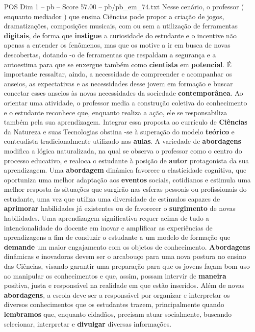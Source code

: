 \begin{textsample}{POS Dim 1 – pb – Score 57.00 – pb/pb\_em\_74.txt}
Nesse cenário, o professor ( enquanto mediador ) que ensina Ciências pode propor a criação de jogos, dramatizações, composições musicais, com ou sem a utilização de ferramentas \textbf{digitais}, de forma que \textbf{instigue} a curiosidade do estudante e o incentive não apenas a entender os fenômenos, mas que os motive a ir em busca de novas descobertas, dotando -o de ferramentas que respaldam a segurança e a autoestima para que se enxergue também como \textbf{cientista} em \textbf{potencial}.
É importante ressaltar, ainda, a necessidade de compreender e acompanhar os anseios, as expectativas e as necessidades desse jovem em formação e buscar conectar esses anseios às novas necessidades da sociedade \textbf{contemporânea}.
Ao orientar uma atividade, o professor media a construção coletiva do conhecimento e o estudante reconhece que, enquanto realiza a ação, ele se responsabiliza também pela sua aprendizagem.
Integrar essa proposta ao currículo de \textbf{Ciências} da Natureza e suas Tecnologias obstina -se à superação do modelo \textbf{teórico} e conteudista tradicionalmente utilizado nas \textbf{aulas}.
A variedade de \textbf{abordagens} modifica a lógica naturalizada, na qual se observa o professor como o centro do processo educativo, e realoca o estudante à posição de \textbf{autor} protagonista da sua aprendizagem.
Uma \textbf{abordagem} dinâmica favorece a elasticidade cognitiva, que oportuniza uma melhor adaptação aos \textbf{eventos} sociais, cotidianos e estimula uma melhor resposta às situações que surgirão nas esferas pessoais ou profissionais do estudante, uma vez que utiliza uma diversidade de estímulos capazes de \textbf{aprimorar} habilidades já existentes ou de favorecer o \textbf{surgimento} de novas habilidades.
Uma aprendizagem significativa requer acima de tudo a intencionalidade do docente em inovar e amplificar as experiências de aprendizagens a fim de conduzir o estudante a um modelo de formação que \textbf{demande} um maior engajamento com os objetos de conhecimento. \textbf{Abordagens} dinâmicas e inovadoras devem ser o arcabouço para uma nova postura no ensino das Ciências, visando garantir uma preparação para que os jovens façam bom uso ao manipular os conhecimentos e que, assim, possam intervir de \textbf{maneira} positiva, justa e responsável na realidade em que estão inseridos.
Além de novas \textbf{abordagens}, a escola deve ser a responsável por organizar e interpretar os diversos conhecimentos que os estudantes trazem, principalmente quando \textbf{lembramos} que, enquanto cidadãos, precisam atuar socialmente, buscando selecionar, interpretar e \textbf{divulgar} diversas informações.

\end{textsample}
